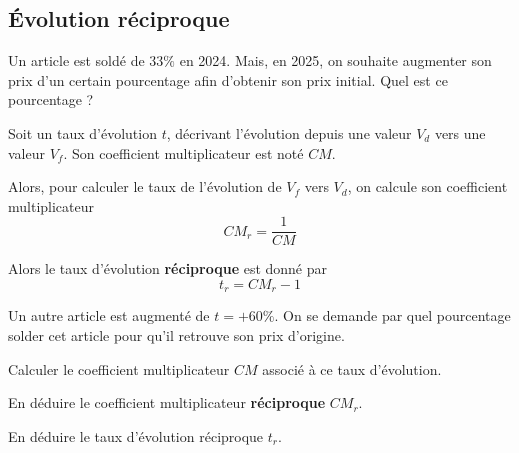 \documentclass{article}
\begin{document}
\subsection{Évolution réciproque}
\begin{example}
Un article est soldé de $33\%$ en 2024. Mais, en 2025, on souhaite augmenter son prix d'un certain pourcentage afin d'obtenir son prix initial. Quel est ce pourcentage ?

\begin{center}
\end{center}
\end{example}
\begin{tcolorbox}
\begin{proposition}
Soit un taux d'évolution $t$, décrivant l'évolution depuis une valeur $V_d$ vers une valeur $V_f$. Son coefficient multiplicateur est noté $CM$. 

Alors, pour calculer le taux de l'évolution de $V_f$ vers $V_d$, on calcule son coefficient multiplicateur
\begin{equation*}
CM_r = \dfrac{1}{CM}
\end{equation*}

Alors le taux d'évolution \textbf{réciproque} est donné par
\begin{equation*}
t_r = CM_r - 1
\end{equation*}
\end{proposition}
\end{tcolorbox}
\begin{example}
Un autre article est augmenté de $t = +60\%$. On se demande par quel pourcentage solder cet article pour qu'il retrouve son prix d'origine.
\begin{enumquestions}
\item Calculer le coefficient multiplicateur $CM$ associé à ce taux d'évolution.
\item En déduire le coefficient multiplicateur \textbf{réciproque} $CM_r$.
\item En déduire le taux d'évolution réciproque $t_r$.
\end{enumquestions}
\vspace*{0.5cm}

\emptybox{3cm}
\end{example}
\end{document}
